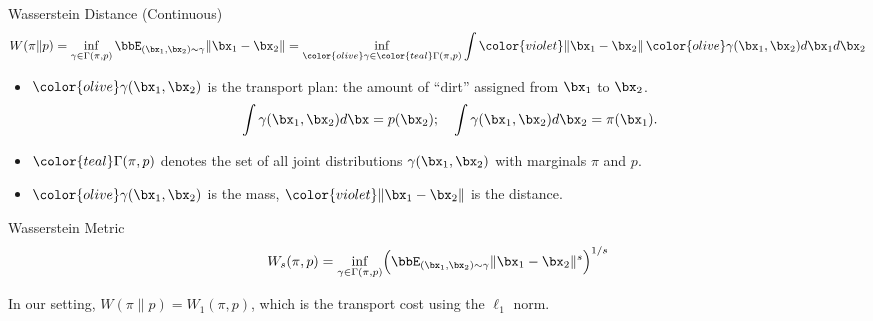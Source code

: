 \documentclass{beamer}
\begin{document}
\begin{frame}{Wasserstein Distance (Continuous)}
	\vspace{-0.5cm}
	{
	\small
	\[
		W(\pi \| p) = \inf_{\gamma \in \Gamma(\pi, p)} \bbE_{(\bx_1, \bx_2) \sim \gamma} \| \bx_1 - \bx_2 \| =  \inf_{{\color{olive}\gamma} \in {\color{teal}\Gamma(\pi, p)}} \int {\color{violet} \| \bx_1 - \bx_2 \|}\, {\color{olive}\gamma (\bx_1, \bx_2)} d \bx_1 d \bx_2
	\]
	}
	\vspace{-0.4cm}
	\begin{itemize}
		\item ${\color{olive}\gamma (\bx_1, \bx_2)}$ is the transport plan: the amount of “dirt” assigned from $\bx_1$ to $\bx_2$.
		\vspace{-0.2cm}
		\[
		\int \gamma(\bx_1, \bx_2) d \bx = p(\bx_2); \quad \int \gamma(\bx_1, \bx_2) d \bx_2 = \pi(\bx_1).
		\]
		\vspace{-0.6cm}
		\item ${\color{teal}\Gamma(\pi, p)}$ denotes the set of all joint distributions $\gamma (\bx_1, \bx_2)$ with marginals $\pi$ and $p$.
		\item ${\color{olive}\gamma(\bx_1, \bx_2)}$ is the mass, ${\color{violet}\|\bx_1 - \bx_2\|}$ is the distance.
	\end{itemize}
	\eqpause
	\begin{block}{Wasserstein Metric}
		\vspace{-0.2cm}
		\[
		W_s(\pi, p) = \inf_{\gamma \in \Gamma(\pi, p)} \Bigl(\bbE_{(\bx_1, \bx_2) \sim \gamma} \|\bx_1 - \bx_2\|^s\Bigr)^{1/s}
		\]
		\vspace{-0.4cm}
	\end{block}
	In our setting, $W(\pi \| p) = W_1(\pi, p)$, which is the transport cost using the $\ell_1$ norm.
\end{frame}
\end{document}
